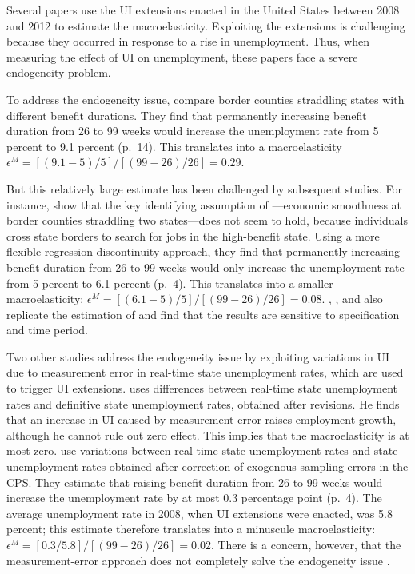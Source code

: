 \documentclass[letterpaper,12pt,leqno]{article}
\newcommand{\brk}[1]{\left[ #1 \right]}
\def \e{{\epsilon}}
\begin{document}
Several papers use the UI extensions enacted in the United States between 2008 and 2012 to estimate the macroelasticity. Exploiting the extensions is challenging because they occurred in response to a rise in unemployment. Thus, when measuring the effect of UI on unemployment, these papers face a severe endogeneity problem.

To address the endogeneity issue, \citet{HKM13} compare border counties straddling states with different benefit durations. They find that permanently increasing benefit duration from 26 to 99 weeks would increase the unemployment rate from 5 percent to 9.1 percent (p.~14). This translates into a macroelasticity $\e^M= \brk{(9.1-5)/5}/\brk{(99-26)/26} = 0.29$. 

But this relatively large estimate has been challenged by subsequent studies. For instance, \citet{DBB16} show that the key identifying assumption of \citet{HKM13}---economic smoothness at border counties straddling two states---does not seem to hold, because individuals cross state borders to search for jobs in the high-benefit state. Using a more flexible regression discontinuity approach, they find that permanently increasing benefit duration from 26 to 99 weeks would only increase the unemployment rate from 5 percent to 6.1 percent (p.~4). This  translates into a smaller macroelasticity: $\e^M=\brk{(6.1-5)/5}/\brk{(99-26)/26}= 0.08$. \citet{C15}, \citet{AI14}, and \citet{BDG16} also replicate the estimation of \citet{HKM13} and find that the results are sensitive to specification and time period.

Two other studies address the endogeneity issue by exploiting variations in UI due to measurement error in real-time state unemployment rates, which are used to trigger UI extensions. \citet{C15} uses differences between real-time state unemployment rates and definitive state unemployment rates, obtained after revisions. He finds that an increase in UI caused by measurement error raises employment growth, although he cannot rule out zero effect. This implies that the macroelasticity is at most zero. \citet{CK16} use variations between real-time state unemployment rates and state unemployment rates obtained after correction of exogenous sampling errors in the CPS. They estimate that raising benefit duration from 26 to 99 weeks would increase the unemployment rate by at most 0.3 percentage point (p.~4). The average unemployment rate in 2008, when UI extensions were enacted, was 5.8 percent; this estimate therefore translates into a minuscule macroelasticity: $\e^M=\brk{0.3/5.8}/\brk{(99-26)/26}=0.02$. There is a concern, however, that the measurement-error approach does not completely solve the endogeneity issue \citep{HMM16}.
\end{document}
